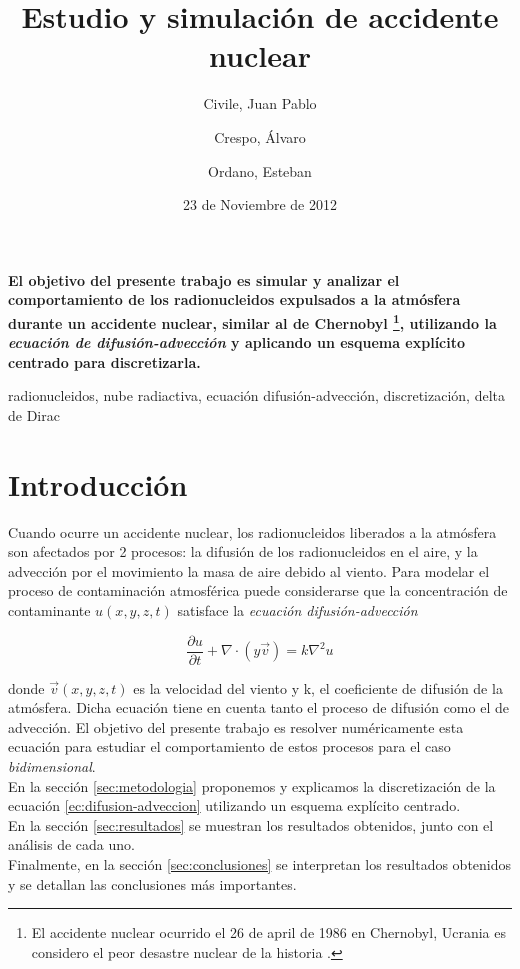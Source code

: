 \documentclass[twocolumn,a4paper,10pt]{article}
\title{Estudio y simulaci\'on de accidente nuclear}
\date{23 de Noviembre de 2012}
\author{Civile, Juan Pablo \and Crespo, Álvaro \and Ordano, Esteban }
\begin{document}
\pagestyle{fancy}
\maketitle
\thispagestyle{fancy}

\begin{customabstract}
\textbf{
El objetivo del presente trabajo es simular y analizar el comportamiento de los radionucleidos expulsados a la atm\'osfera durante un accidente nuclear, similar al 
de Chernobyl \footnote{El accidente nuclear ocurrido el 26 de april de 1986 en Chernobyl, Ucrania es considero el peor desastre nuclear de la historia \cite{Chernobyl}.}, 
utilizando la \textit{ecuaci\'on de difusi\'on-advecci\'on} y aplicando un esquema expl\'icito centrado para discretizarla.
}
\end{customabstract}

\begin{keywords}
radionucleidos, nube radiactiva,  ecuaci\'on difusi\'on-advecci\'on, discretizaci\'on, delta de Dirac
\end{keywords}

\section{Introducci\'on}

Cuando ocurre un accidente nuclear, los radionucleidos liberados a la atm\'osfera son afectados por 2 procesos: la difusi\'on de los radionucleidos en el aire, y
la advecci\'on por el movimiento la masa de aire debido al viento. Para modelar el proceso de contaminaci\'on atmosf\'erica puede considerarse que la concentraci\'on de
contaminante $u(x,y,z,t)$ satisface la \textit{ecuaci\'on difusi\'on-advecci\'on}

\begin{equation}
\label{ec:difusion-adveccion}
    \frac{\partial u}{\partial t} + \nabla \cdot (y \vec{v}) = k \nabla^2 u
\end{equation}

donde $\vec{v} (x,y,z,t)$ es la velocidad del viento  y k, el coeficiente de difusi\'on de la atm\'osfera. Dicha ecuaci\'on tiene en cuenta tanto el proceso de 
difusi\'on como el de advecci\'on. El objetivo del presente trabajo es resolver num\'ericamente esta ecuaci\'on para estudiar el comportamiento de estos procesos 
para el caso \textit{bidimensional}.\\

En la secci\'on \ref{sec:metodologia} proponemos y explicamos la discretizaci\'on de la ecuaci\'on \ref{ec:difusion-adveccion} utilizando un esquema expl\'icito 
centrado.\\
En la secci\'on \ref{sec:resultados} se muestran los resultados obtenidos, junto con el an\'alisis de cada uno. \\
Finalmente, en la secci\'on \ref{sec:conclusiones} se interpretan los resultados obtenidos y se detallan las conclusiones m\'as importantes. \\
\end{document}
